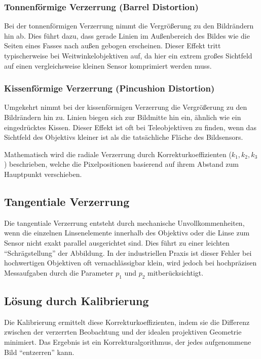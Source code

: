 \documentclass[12pt,a4paper,parskip=half]{scrartcl}
\begin{document}
\subsubsection{Tonnenförmige Verzerrung (Barrel Distortion)}
Bei der tonnenförmigen Verzerrung nimmt die Vergrößerung zu den Bildrändern hin ab. Dies führt dazu, dass gerade Linien im Außenbereich des Bildes wie die Seiten eines Fasses nach außen gebogen erscheinen. Dieser Effekt tritt typischerweise bei Weitwinkelobjektiven auf, da hier ein extrem großes Sichtfeld auf einen vergleichsweise kleinen Sensor komprimiert werden muss.

\subsubsection{Kissenförmige Verzerrung (Pincushion Distortion)}
Umgekehrt nimmt bei der kissenförmigen Verzerrung die Vergrößerung zu den Bildrändern hin zu. Linien biegen sich zur Bildmitte hin ein, ähnlich wie ein eingedrücktes Kissen. Dieser Effekt ist oft bei Teleobjektiven zu finden, wenn das Sichtfeld des Objektivs kleiner ist als die tatsächliche Fläche des Bildsensors.

Mathematisch wird die radiale Verzerrung durch Korrekturkoeffizienten ($k_1, k_2, k_3$) beschrieben, welche die Pixelpositionen basierend auf ihrem Abstand zum Hauptpunkt verschieben.

\subsection{Tangentiale Verzerrung}
Die tangentiale Verzerrung entsteht durch mechanische Unvollkommenheiten, wenn die einzelnen Linsenelemente innerhalb des Objektivs oder die Linse zum Sensor nicht exakt parallel ausgerichtet sind. Dies führt zu einer leichten \enquote{Schrägstellung} der Abbildung. In der industriellen Praxis ist dieser Fehler bei hochwertigen Objektiven oft vernachlässigbar klein, wird jedoch bei hochpräzisen Messaufgaben durch die Parameter $p_1$ und $p_2$ mitberücksichtigt.

\subsection{Lösung durch Kalibrierung}
Die Kalibrierung ermittelt diese Korrekturkoeffizienten, indem sie die Differenz zwischen der verzerrten Beobachtung und der idealen projektiven Geometrie minimiert. Das Ergebnis ist ein Korrekturalgorithmus, der jedes aufgenommene Bild \enquote{entzerren} kann. 
\end{document}
